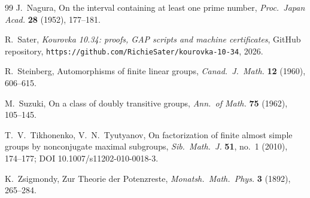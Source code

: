 \documentclass[11pt]{amsart}
\theoremstyle{definition}
\theoremstyle{remark}
\begin{document}
\begin{thebibliography}{99}
J.~Nagura, On the interval containing at least one prime number,
\emph{Proc.\ Japan Acad.} \textbf{28} (1952), 177--181.

R.~Sater, \emph{Kourovka 10.34: proofs, GAP scripts and machine
certificates}, GitHub repository,
\texttt{https://github.com/RichieSater/kourovka-10-34}, 2026.

R.~Steinberg, Automorphisms of finite linear groups,
\emph{Canad.\ J.\ Math.} \textbf{12} (1960), 606--615.

M.~Suzuki, On a class of doubly transitive groups,
\emph{Ann.\ of Math.} \textbf{75} (1962), 105--145.

T.~V.~Tikhonenko, V.~N.~Tyutyanov, On factorization of finite almost
simple groups by nonconjugate maximal subgroups, \emph{Sib.\ Math.\ J.}
\textbf{51}, no.~1 (2010), 174--177; DOI 10.1007/s11202-010-0018-3.

K.~Zsigmondy, Zur Theorie der Potenzreste, \emph{Monatsh.\ Math.\
Phys.} \textbf{3} (1892), 265--284.

\end{thebibliography}
\end{document}
